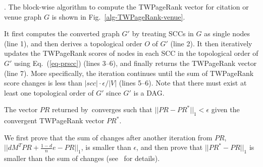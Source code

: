 




.
The block-wise algorithm to compute the TWPageRank vector for citation or venue graph $G$ is shown in Fig.~\ref{alg-TWPageRank-venue}.

It first computes the converted graph $G'$  by treating SCCs in $G$ as single nodes (line 1), and then derives a topological order $O$ of $G'$ (line 2). It then iteratively updates the TWPageRank scores of nodes in each SCC in the topological order of $G'$ using  Eq.~(\ref{eq-prscc}) (lines 3--6), and finally returns the TWPageRank vector (line 7). More specifically, the iteration continues until the sum of TWPageRank score changes is less than $|scc|\cdot\epsilon/|V|$ (lines 5--6). Note that there must exist at least one topological order of $G'$ since $G'$ is a DAG.





\begin{lemma} \label{prop-prscc}
The vector $PR$ returned by~\twprscc converges such that $||PR-PR^*||_1 < \epsilon$ given the convergent TWPageRank vector $PR^*$.
\end{lemma}

\begin{proofSketch}
We first prove that the sum of changes after another iteration from $PR$, \ie $||d M^T PR + \frac{1-d}{n} e-PR||_1$, is smaller than $\epsilon$, and then prove that $||PR^*-PR||_1$ is smaller than the sum of changes (see~\cite {ERank-full} for details). %
\end{proofSketch}


